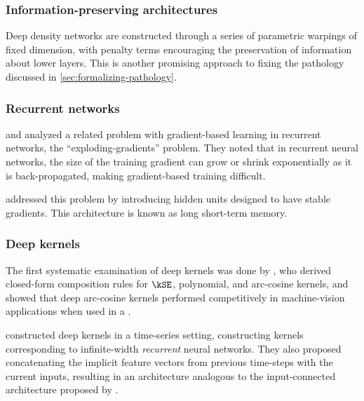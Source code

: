 %
%
%

\subsubsection{Information-preserving architectures}
Deep density networks \citep{rippel2013high} are constructed through a series of parametric warpings of fixed dimension, with penalty terms encouraging the preservation of information about lower layers.
This is another promising approach to fixing the pathology discussed in \cref{sec:formalizing-pathology}.

\subsubsection{Recurrent networks}
\citet{bengio1994learning} and \citet{pascanu2012understanding} analyzed a related problem with gradient-based learning in recurrent networks, the ``exploding-gradients'' problem.
They noted that in recurrent neural networks, the size of the training gradient can grow or shrink exponentially as it is back-propagated, making gradient-based training difficult.

\citet{hochreiter1997long} addressed this problem by introducing hidden units designed to have stable gradients.
This architecture is known as long short-term memory.

\subsubsection{Deep kernels}

The first systematic examination of deep kernels was done by \citet{cho2009kernel}, who derived closed-form composition rules for $\kSE$, polynomial, and arc-cosine kernels, and showed that deep arc-cosine kernels performed competitively in machine-vision applications when used in a \SVM{}.

\citet{hermans2012recurrent} constructed deep kernels in a time-series setting, constructing kernels corresponding to infinite-width \emph{recurrent} neural networks.
They also proposed concatenating the implicit feature vectors from previous time-steps with the current inputs, resulting in an architecture analogous to the input-connected architecture proposed by \citet[chapter 2]{neal1995bayesian}.


